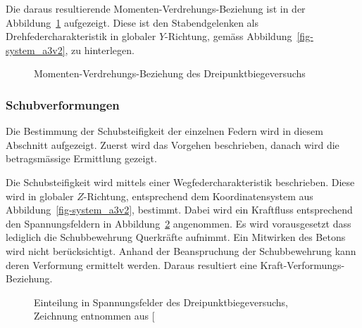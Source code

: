 \documentclass[
  11pt,
  letterpaper,
]{scrreprt}
\begin{document}
Die daraus resultierende Momenten-Verdrehungs-Beziehung ist in der
Abbildung~\ref{fig-mphi_a3v2} aufgezeigt. Diese ist den Stabendgelenken
als Drehfedercharakteristik in globaler \(Y\)-Richtung, gemäss
Abbildung~\ref{fig-system_a3v2}, zu hinterlegen.

\begin{figure}[H]


\caption{\label{fig-mphi_a3v2}Momenten-Verdrehungs-Beziehung des
Dreipunktbiegeversuchs}

\end{figure}%

\subsubsection{Schubverformungen}\label{schubverformungen}

Die Bestimmung der Schubsteifigkeit der einzelnen Federn wird in diesem
Abschnitt aufgezeigt. Zuerst wird das Vorgehen beschrieben, danach wird
die betragsmässige Ermittlung gezeigt.

Die Schubsteifigkeit wird mittels einer Wegfedercharakteristik
beschrieben. Diese wird in globaler \(Z\)-Richtung, entsprechend dem
Koordinatensystem aus Abbildung~\ref{fig-system_a3v2}, bestimmt. Dabei
wird ein Kraftfluss entsprechend den Spannungsfeldern in
Abbildung~\ref{fig-spannungsfelder_a3v2} angenommen. Es wird
vorausgesetzt dass lediglich die Schubbewehrung Querkräfte aufnimmt. Ein
Mitwirken des Betons wird nicht berücksichtigt. Anhand der Beanspruchung
der Schubbewehrung kann deren Verformung ermittelt werden. Daraus
resultiert eine Kraft-Verformungs-Beziehung.

\begin{figure}[H]


\caption{\label{fig-spannungsfelder_a3v2}Einteilung in Spannungsfelder
des Dreipunktbiegeversuchs, Zeichnung entnommen aus
{[}\citeproc{ref-gitz_ansatze_2024}{1}{]}}

\end{figure}%
\end{document}
